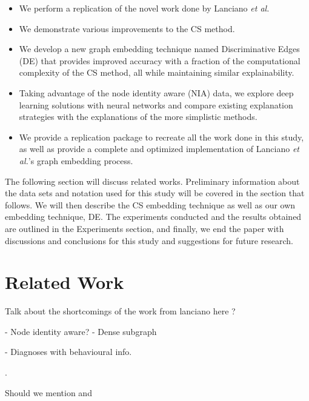 \documentclass[letterpaper]{article}
\begin{document}
\begin{itemize}
    \item We perform a replication of the novel work done by Lanciano \emph{et al.}
    \item We demonstrate various improvements to the CS method.
    \item We develop a new graph embedding technique named Discriminative Edges (DE) that provides improved accuracy with a fraction of the computational complexity of the CS method, all while maintaining similar explainability.
    \item Taking advantage of the node identity aware (NIA) data, we explore deep learning solutions with neural networks and compare existing explanation strategies with the explanations of the more simplistic methods.
    \item We provide a replication package to recreate all the work done in this study, as well as provide a complete and optimized implementation of Lanciano \emph{et al.}'s graph embedding process.
\end{itemize}

The following section will discuss related works.
Preliminary information about the data sets and notation used for this study will be covered in the section that follows.
We will then describe the CS embedding technique as well as our own embedding technique, DE.
The experiments conducted and the results obtained are outlined in the Experiments section, and finally, we end the paper with discussions and conclusions for this study and suggestions for future research.



\section{Related Work}


Talk about the shortcomings of the work from lanciano here \cite{lanciano2020}?

\cite{gutierrez2019} - Node identity aware?
\cite{tsourakakis2013} - Dense subgraph

\cite{abbas2020} - Diagnoses with behavioural info.

\cite{thomas2020}
\cite{sewani2020}.

\cite{kong2019}

Should we mention \cite{perotti2022} and \cite{coupette2022}
\end{document}

